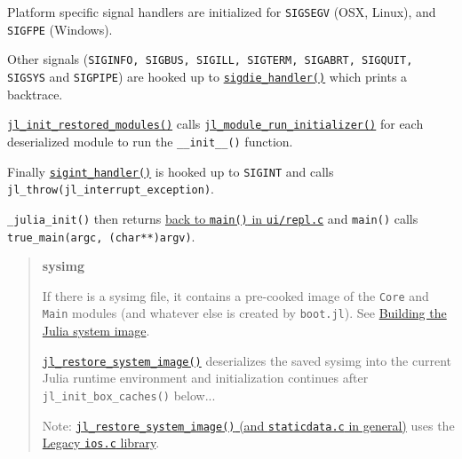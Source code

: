 Platform specific signal handlers are initialized for \texttt{SIGSEGV} (OSX, Linux), and \texttt{SIGFPE} (Windows).



Other signals (\texttt{SIGINFO, SIGBUS, SIGILL, SIGTERM, SIGABRT, SIGQUIT, SIGSYS} and \texttt{SIGPIPE}) are hooked up to \href{https://github.com/JuliaLang/julia/blob/master/src/signals-unix.c}{\texttt{sigdie\_handler()}} which prints a backtrace.



\href{https://github.com/JuliaLang/julia/blob/master/src/staticdata.c}{\texttt{jl\_init\_restored\_modules()}} calls \href{https://github.com/JuliaLang/julia/blob/master/src/module.c}{\texttt{jl\_module\_run\_initializer()}} for each deserialized module to run the \texttt{\_\_init\_\_()} function.



Finally \href{https://github.com/JuliaLang/julia/blob/master/src/signals-unix.c}{\texttt{sigint\_handler()}} is hooked up to \texttt{SIGINT} and calls \texttt{jl\_throw(jl\_interrupt\_exception)}.



\texttt{\_julia\_init()} then returns \href{https://github.com/JuliaLang/julia/blob/master/ui/repl.c}{back to \texttt{main()} in \texttt{ui/repl.c}} and \texttt{main()} calls \texttt{true\_main(argc, (char**)argv)}.



\begin{quote}
\textbf{sysimg}

If there is a sysimg file, it contains a pre-cooked image of the \texttt{Core} and \texttt{Main} modules (and whatever else is created by \texttt{boot.jl}). See \hyperlink{15513456349900674098}{Building the Julia system image}.

\href{https://github.com/JuliaLang/julia/blob/master/src/staticdata.c}{\texttt{jl\_restore\_system\_image()}} deserializes the saved sysimg into the current Julia runtime environment and initialization continues after \texttt{jl\_init\_box\_caches()} below...

Note: \href{https://github.com/JuliaLang/julia/blob/master/src/staticdata.c}{\texttt{jl\_restore\_system\_image()} (and \texttt{staticdata.c} in general)} uses the \hyperlink{3841537160196121279}{Legacy \texttt{ios.c} library}.

\end{quote}


\hypertarget{8052465870854670365}{}


